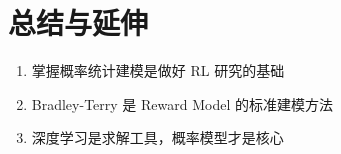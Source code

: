 \section{总结与延伸}
\begin{enumerate}
  \item 掌握概率统计建模是做好 RL 研究的基础
  \item Bradley-Terry 是 Reward Model 的标准建模方法
  \item 深度学习是求解工具，概率模型才是核心
\end{enumerate}

